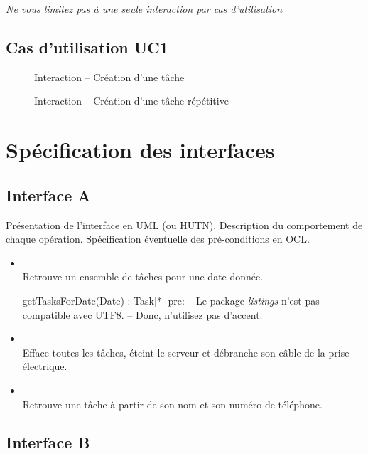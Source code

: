\emph{Ne vous limitez pas à une seule interaction par cas d'utilisation}

\subsection{Cas d'utilisation UC1}

\begin{figure}[htbp]
	\centering
	\caption{Interaction \--- Création d'une tâche}
	\label{fig:label}
\end{figure}

\begin{figure}[htbp]
	\centering
	\caption{Interaction \--- Création d'une tâche répétitive}
	\label{fig:label}
\end{figure}

\section{Spécification des interfaces}

	\subsection{Interface A}
	
	Présentation de l'interface en UML (ou HUTN). Description du comportement de chaque opération. Spécification éventuelle des pré-conditions en OCL.
	
\begin{itemize}
	\item {} \\
	Retrouve un ensemble de tâches pour une date donnée.
\begin{ocl}
getTasksForDate(Date) : Task[*]
pre: 
-- Le package \emph{listings} n'est pas compatible avec UTF8.
-- Donc, n'utilisez pas d'accent.
\end{ocl}
	
	\item {} \\
	Efface toutes les tâches, éteint le serveur et débranche son câble de la prise électrique.
	
	\item {} \\
	Retrouve une tâche à partir de son nom et son numéro de téléphone.
\end{itemize}	
	\subsection{Interface B}
	
